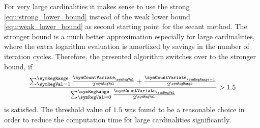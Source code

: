 \documentclass[a4paper]{scrartcl}
\begin{document}
For very large cardinalities it makes sense to use the strong \eqref{equ:strong_lower_bound} instead of the weak lower bound \eqref{equ:weak_lower_bound} as second starting point for the secant method. The stronger bound is a much better approximation especially for large cardinalities, where the extra logarithm evaluation is amortized by savings in the number of iteration cycles. Therefore, the presented algorithm switches over to the stronger bound, if 
\begin{equation}
\frac{
\sum_{\symRegVal=1}^{\symRegRange}\frac{\symCountVariate_\symRegVal}{2^\symRegVal} + \frac{\symCountVariate_{\symRegRange+1}}{2^\symRegRange}
}{
\sum_{\symRegVal=0}^{\symRegRange}\frac{\symCountVariate_\symRegVal}{2^\symRegVal}
}
> 1.5
\end{equation}
is satisfied. The threshold value of $1.5$ was found to be a reasonable choice in order to reduce the computation time for large cardinalities significantly.
\end{document}
